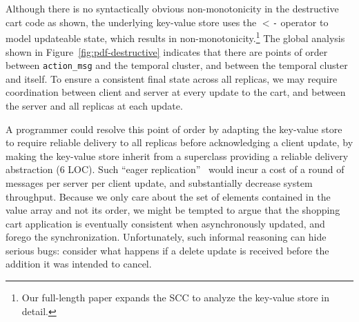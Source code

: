 
Although there is no syntactically obvious non-monotonicity in the destructive
cart code as shown, the underlying key-value store uses the \texttt{$<$-} operator to model updateable state, which results in non-monotonicity.\footnote{Our full-length paper expands the SCC to analyze the
key-value store in detail.}
The global analysis shown in Figure~\ref{fig:pdf-destructive}
indicates that there are
points of order between \texttt{action\_msg} and the temporal cluster,
and between the temporal cluster and itself.
To ensure a consistent final state across all replicas, we may require coordination
between client and server at every update to the cart, and between the 
server and all replicas at each update.   

A programmer could resolve this point of order by adapting the key-value store
to require reliable delivery to all replicas before acknowledging a client update, by
making the key-value store inherit from a superclass providing a reliable delivery
abstraction (6 LOC).
Such ``eager replication''~\cite{dangers} would incur a cost of a round of messages
per server per client update, and substantially decrease system throughput.  
Because we only care about the set of elements contained in the value array
and not its order, we might be tempted to argue that 
the shopping cart application is eventually consistent
when asynchronously updated, and forego the synchronization.  Unfortunately, such informal reasoning can hide serious bugs: consider what happens if a delete update is received
before the addition it was intended to cancel.



